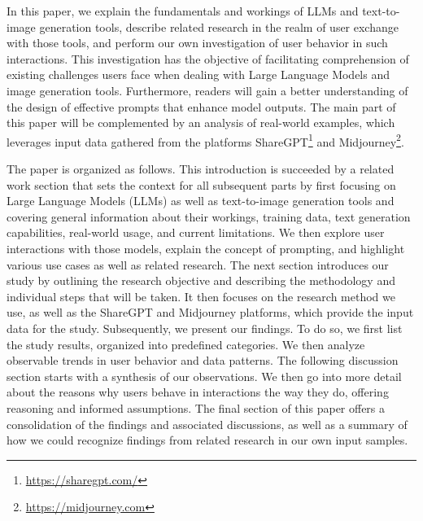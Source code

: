 In this paper, we explain the fundamentals and workings of LLMs and text-to-image
generation tools,
describe related research in the realm of user exchange with those tools, and perform our own
investigation of user behavior in such interactions.
This investigation has the objective of facilitating comprehension of existing challenges users
face when dealing with Large Language Models and image generation tools.
Furthermore, readers will gain a better understanding of the design of effective prompts that
enhance model outputs.
The main part of this paper will be complemented by an analysis of real-world examples, which
leverages input data gathered from the platforms ShareGPT\footnote{\url{https://sharegpt.com/}} and
Midjourney\footnote{\url{https://midjourney.com}}.

The paper is organized as follows.
This introduction is succeeded by a related work section that sets the context for all subsequent
parts by first focusing on Large Language Models (LLMs) as well as text-to-image generation
tools and covering general information about
their workings, training data, text generation capabilities, real-world usage, and current limitations.
We then explore user interactions with those models, explain the concept of prompting, and highlight
various use cases as well as related research.
%
The next section introduces our study by outlining the research objective and
describing the methodology and individual steps that will be taken.
It then focuses on the research method we use, as well as the ShareGPT and Midjourney platforms,
which provide the input data for the study.
%
Subsequently, we present our findings.
To do so, we first list the study results, organized into predefined categories.
We then analyze observable trends in user behavior and data patterns.
%
The following discussion section starts with a synthesis of our observations.
We then go into more detail about the reasons why users behave in interactions the way
they do, offering reasoning and informed assumptions.
%
The final section of this paper offers a consolidation of the findings and associated discussions,
as well as a summary of how we could recognize findings from related research in our own input
samples.